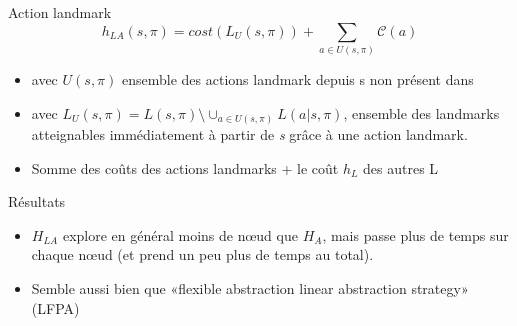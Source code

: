 \begin{frame}
  \begin{block}{Action landmark}
    \begin{displaymath}
      h_{LA}(s, \pi) = cost(L_U(s, \pi)) + \sum_{a\in U(s, \pi)} \mathcal{C}(a)
    \end{displaymath}

    \begin{itemize}
      \item avec $U(s, \pi)$ ensemble des actions landmark depuis s non présent dans \pi
      \item avec $L_U(s, \pi) = L(s, \pi) \setminus \cup_{a \in U(s, \pi)} L(a | s, \pi)$, ensemble des landmarks atteignables immédiatement à partir de \emph{s} grâce à une action landmark.  
      \item Somme des coûts des actions landmarks + le coût $h_L$ des autres L
    \end{itemize}
  \end{block}
\end{frame}

\begin{frame}
  \begin{block}{Résultats}
    \begin{itemize}
      \proitem $LM-A*<H_{LA}$ résout plus de tâche que $A*<H_{LA}$ (moins rapide pour les petites instances)
      \item $H_{LA}$ explore en général moins de nœud que $H_{A}$, mais passe plus de temps sur chaque nœud (et prend un peu plus de temps au total).
      \item Semble aussi bien que «flexible abstraction linear abstraction strategy» (LFPA)
    \end{itemize}
  \end{block}
\end{frame}

